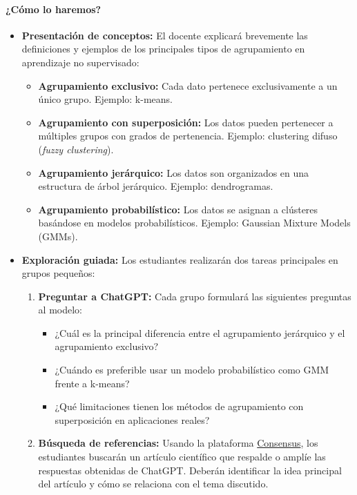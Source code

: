 \documentclass[a4,11pt]{aleph-notas}
\begin{document}
\paragraph{¿Cómo lo haremos?}  
\begin{itemize}[leftmargin=*]
    \item \textbf{Presentación de conceptos:}  
    El docente explicará brevemente las definiciones y ejemplos de los principales tipos de agrupamiento en aprendizaje no supervisado:
    \begin{itemize}
        \item \textbf{Agrupamiento exclusivo:} Cada dato pertenece exclusivamente a un único grupo. Ejemplo: k-means.
        \item \textbf{Agrupamiento con superposición:} Los datos pueden pertenecer a múltiples grupos con grados de pertenencia. Ejemplo: clustering difuso (\textit{fuzzy clustering}).
        \item \textbf{Agrupamiento jerárquico:} Los datos son organizados en una estructura de árbol jerárquico. Ejemplo: dendrogramas.
        \item \textbf{Agrupamiento probabilístico:} Los datos se asignan a clústeres basándose en modelos probabilísticos. Ejemplo: Gaussian Mixture Models (GMMs).
    \end{itemize}
    \item \textbf{Exploración guiada:}  
    Los estudiantes realizarán dos tareas principales en grupos pequeños:
    \begin{enumerate}
        \item \textbf{Preguntar a ChatGPT:} Cada grupo formulará las siguientes preguntas al modelo:
        \begin{itemize}
            \item ¿Cuál es la principal diferencia entre el agrupamiento jerárquico y el agrupamiento exclusivo?
            \item ¿Cuándo es preferible usar un modelo probabilístico como GMM frente a k-means?
            \item ¿Qué limitaciones tienen los métodos de agrupamiento con superposición en aplicaciones reales?
        \end{itemize}
        \item \textbf{Búsqueda de referencias:} Usando la plataforma \href{https://consensus.app/}{Consensus}, los estudiantes buscarán un artículo científico que respalde o amplíe las respuestas obtenidas de ChatGPT. Deberán identificar la idea principal del artículo y cómo se relaciona con el tema discutido.
    \end{enumerate}
\end{itemize}
\end{document}
